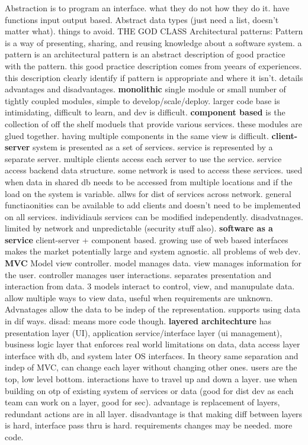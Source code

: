 \documentclass[10pt]{article}
\begin{document}
\begin{landscape}
\begin{multicols*}{6}
Abstraction is to program an interface. what they do not how they do it. have functions input output based. Abstract data types (just need a list, doesn't matter what). things to avoid. THE GOD CLASS
Architectural patterns: Pattern is a way of presenting, sharing, and reusing knowledge about a software system. a pattern is an architectural pattern is an abstract description of good practice with the pattern. this good practice description comes from yeears of experiences. this description clearly identify if pattern is appropriate and where it isn't. details advantages and disadvantages. \textbf{monolithic} single module or small number of tightly coupled modules, simple to develop/scale/deploy. larger code base is intimidating, difficult to learn, and dev is difficult. \textbf{component based} is the collection of off the  shelf moduels that provide various services. these modules are glued together. having multiple components in the same view is difficult. \textbf{client-server} system is presented as a set of services. service is represented by a separate server. multiple clients access each server to use the service. service access backend data structure. some network is used to access these services. used when data in shared db needs to be accessed from multiple locations and if the load on the system is variable. allws for dist of services across network. general functiaonities can be available to add clients and doesn't need to be implemented on all services. individiauls services can be modified independently. disadvatnages. limited by network and unpredictable (security stuff also). \textbf{software as a service} client-server + component based. growing use of web based interfaces makes the market potentially large and system agnostic. all problems of web dev. \textbf{MVC} Model view controller. model manages data. view manages information for the user. controller manages user interactions. separates presentation and interaction from data. 3 models interact to control, view, and manupulate data. allow multiple ways to view data, useful when requirements are unknown. Advnatages allow the data to be indep of the representation. supports using data in dif ways. disad: means more code though. \textbf{layered architechture} has presentation layer (UI), application service/interface layer (ui management), business logic layer that enforces real world limitations on data, data access layer interface with db, and system later OS interfaces. In theory same separation and indep of MVC, can change each layer without changing other ones. users are the top, low level bottom. interactions have to travel up and down a layer. use when building on otp of existing system of services or data (good for dist dev as each team can work on a layer, good for sec). advantage is replacement of layers, redundant actions are in all layer. disadvantage is that making diff between layers is hard, interface pass thru is hard. requirements changes may be needed. more code. 

\end{multicols*}
\end{landscape}
\end{document}
